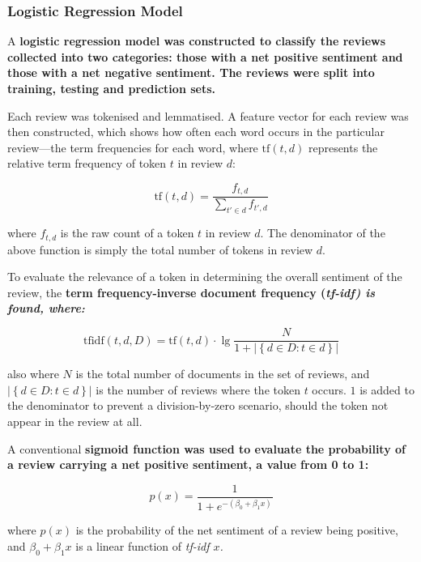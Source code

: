 \documentclass[12pt,bibliography=totocnumbered]{scrartcl}
\begin{document}
{\subsubsection{Logistic Regression Model}
A \bf{logistic regression model} was constructed to classify the reviews collected into
two categories: those with a net positive sentiment and those with a net negative sentiment.
The reviews were split into training, testing and prediction sets.

Each review was tokenised and lemmatised. A feature vector for each review was
then constructed, which shows how often each word occurs in the particular review---the
term frequencies for each word, where $\text{tf}(t,d)$ represents the relative term frequency of
token $t$ in review $d$:

\begin{equation}
	\text{tf}(t,d) = \frac{f_{t,d}}{\sum_{t'\in d}^{}f_{t',d}}
	\label{eq:tf}
\end{equation}

where $f_{t,d}$ is the raw count of a token $t$ in review $d$. The denominator of the above
function is simply the total number of tokens in review $d$.

To evaluate the relevance of a token in determining the overall sentiment of the
review, the \bf{term frequency-inverse document frequency} (\it{tf-idf}) is found, where:

\begin{equation}
	\text{tfidf}(t,d,D) = \text{tf}(t,d)\cdot\lg\frac{N}{1+\left|\left\{d\in D : t\in d\right\}\right|}
	\label{eq:tfidf}
\end{equation}

also where $N$ is the total number of documents in the set of reviews, and
$\left|\left\{d\in D : t\in d\right\}\right|$ is the number of reviews where
the token $t$ occurs. $1$ is added to the denominator to prevent a
division-by-zero scenario, should the token not appear in the review at all.

A conventional \bf{sigmoid function} was used to evaluate the probability
of a review carrying a net positive sentiment, a value from 0 to 1:

\begin{equation}
	p(x) = \frac{1}{1+e^{-{\left(\beta_0+\beta_1x\right)}}}
	\label{eq:sigmoid}
\end{equation}

where $p(x)$ is the probability of the net sentiment of a review being positive, and
$\beta_0+\beta_1x$ is a linear function of \it{tf-idf} $x$.

}
\end{document}
